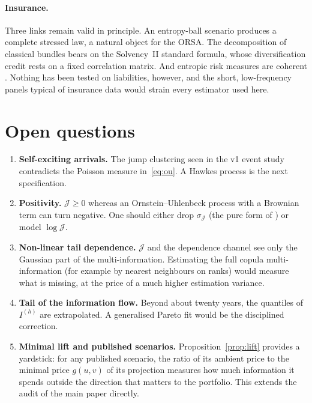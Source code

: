 \documentclass[11pt]{article}
\theoremstyle{definition}
\theoremstyle{remark}
\newcommand{\JJ}{\mathcal{J}}
\begin{document}
\paragraph{Insurance.} Three links remain valid in principle. An entropy-ball
scenario produces a complete stressed law, a natural object for the ORSA. The
decomposition of classical bundles bears on the Solvency~II standard formula,
whose diversification credit rests on a fixed correlation matrix. And entropic
risk measures are coherent \citep{ahmadijavid2012,artzner1999}. Nothing has been
tested on liabilities, however, and the short, low-frequency panels typical of
insurance data would strain every estimator used here.

\section{Open questions}
\label{sec:open}

\begin{enumerate}
\item \textbf{Self-exciting arrivals.} The jump clustering seen in the v1 event
study contradicts the Poisson measure in~\eqref{eq:ou}. A Hawkes process is the
next specification.
\item \textbf{Positivity.} $\JJ\ge0$ whereas an Ornstein--Uhlenbeck process with
a Brownian term can turn negative. One should either drop $\sigma_\JJ$ (the
pure form of \citealt{bns2001}) or model $\log\JJ$.
\item \textbf{Non-linear tail dependence.} $\JJ$ and the dependence channel see
only the Gaussian part of the multi-information. Estimating the full copula
multi-information (for example by nearest neighbours on ranks) would measure
what is missing, at the price of a much higher estimation variance.
\item \textbf{Tail of the information flow.} Beyond about twenty years, the
quantiles of $I^{(h)}$ are extrapolated. A generalised Pareto fit would be the
disciplined correction.
\item \textbf{Minimal lift and published scenarios.}
Proposition~\ref{prop:lift} provides a yardstick: for any published scenario,
the ratio of its ambient price to the minimal price $g(u,v)$ of its projection
measures how much information it spends outside the direction that matters to
the portfolio. This extends the audit of the main paper directly.
\end{enumerate}

\appendix
\end{document}
